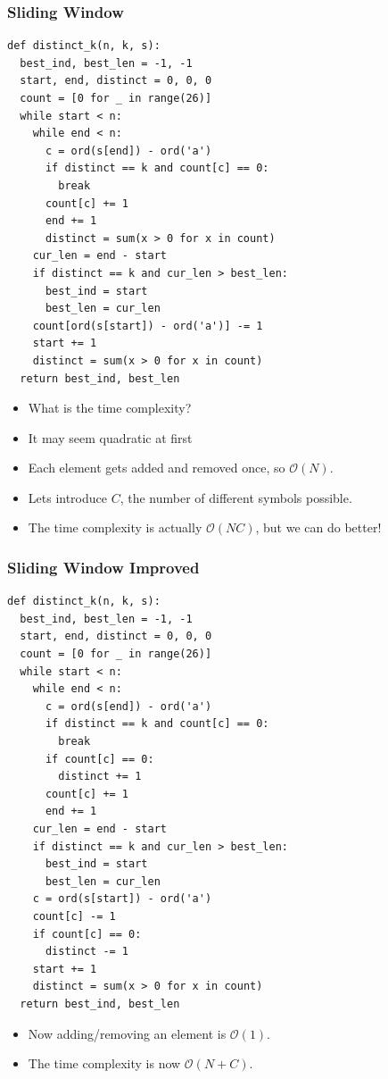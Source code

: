 \documentclass[10pt]{beamer}
\begin{document}
\begin{frame}
    \frametitle{Sliding Window}
	\begin{tiny}
        \begin{verbatim}
def distinct_k(n, k, s):
  best_ind, best_len = -1, -1
  start, end, distinct = 0, 0, 0
  count = [0 for _ in range(26)]
  while start < n:
    while end < n:
      c = ord(s[end]) - ord('a')
      if distinct == k and count[c] == 0:
        break
      count[c] += 1
      end += 1
      distinct = sum(x > 0 for x in count)
    cur_len = end - start
    if distinct == k and cur_len > best_len:
      best_ind = start
      best_len = cur_len
    count[ord(s[start]) - ord('a')] -= 1
    start += 1
    distinct = sum(x > 0 for x in count)
  return best_ind, best_len
        \end{verbatim}
    \end{tiny}
    \begin{itemize}
        \item<2-> What is the time complexity?
        \item<3-> It may seem quadratic at first
        \item<4-> Each element gets added and removed once, so $\mathcal{O}(N)$.
        \item<5-> Lets introduce $C$, the number of different symbols possible.
        \item<6-> The time complexity is actually $\mathcal{O}(NC)$, but we can do better!
    \end{itemize}
\end{frame}


\begin{frame}
    \frametitle{Sliding Window Improved}
	\begin{tiny}
        \begin{verbatim}
def distinct_k(n, k, s):
  best_ind, best_len = -1, -1
  start, end, distinct = 0, 0, 0
  count = [0 for _ in range(26)]
  while start < n:
    while end < n:
      c = ord(s[end]) - ord('a')
      if distinct == k and count[c] == 0:
        break
      if count[c] == 0:
        distinct += 1
      count[c] += 1
      end += 1
    cur_len = end - start
    if distinct == k and cur_len > best_len:
      best_ind = start
      best_len = cur_len
    c = ord(s[start]) - ord('a')
    count[c] -= 1
    if count[c] == 0:
      distinct -= 1
    start += 1
    distinct = sum(x > 0 for x in count)
  return best_ind, best_len
        \end{verbatim}
    \end{tiny}
    \begin{itemize}
        \item<2-> Now adding/removing an element is $\mathcal{O}(1)$.
        \item<3-> The time complexity is now $\mathcal{O}(N + C)$.
    \end{itemize}
\end{frame}
\end{document}
